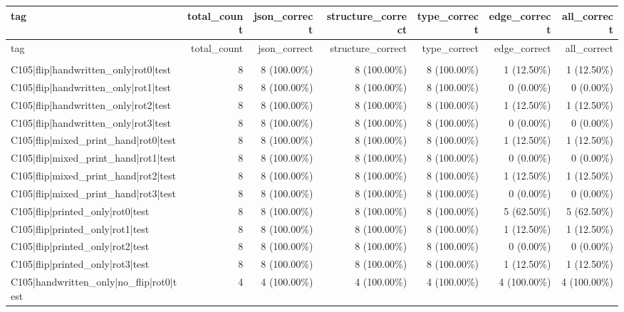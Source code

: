 \begin{longtable}{>{\raggedright\arraybackslash}p{5cm}rrrrrr}
\toprule
tag & total\_count & json\_correct & structure\_correct & type\_correct & edge\_correct & all\_correct \\
\midrule
\endfirsthead
\toprule
tag & total\_count & json\_correct & structure\_correct & type\_correct & edge\_correct & all\_correct \\
\midrule
\endhead
\midrule
\multicolumn{7}{r}{Continued on next page} \\
\midrule
\endfoot
\bottomrule
\endlastfoot
C105|flip|handwritten\_only|rot0|test & 8 & 8 (100.00\%) & 8 (100.00\%) & 8 (100.00\%) & 1 (12.50\%) & 1 (12.50\%) \\
C105|flip|handwritten\_only|rot1|test & 8 & 8 (100.00\%) & 8 (100.00\%) & 8 (100.00\%) & 0 (0.00\%) & 0 (0.00\%) \\
C105|flip|handwritten\_only|rot2|test & 8 & 8 (100.00\%) & 8 (100.00\%) & 8 (100.00\%) & 1 (12.50\%) & 1 (12.50\%) \\
C105|flip|handwritten\_only|rot3|test & 8 & 8 (100.00\%) & 8 (100.00\%) & 8 (100.00\%) & 0 (0.00\%) & 0 (0.00\%) \\
C105|flip|mixed\_print\_hand|rot0|test & 8 & 8 (100.00\%) & 8 (100.00\%) & 8 (100.00\%) & 1 (12.50\%) & 1 (12.50\%) \\
C105|flip|mixed\_print\_hand|rot1|test & 8 & 8 (100.00\%) & 8 (100.00\%) & 8 (100.00\%) & 0 (0.00\%) & 0 (0.00\%) \\
C105|flip|mixed\_print\_hand|rot2|test & 8 & 8 (100.00\%) & 8 (100.00\%) & 8 (100.00\%) & 1 (12.50\%) & 1 (12.50\%) \\
C105|flip|mixed\_print\_hand|rot3|test & 8 & 8 (100.00\%) & 8 (100.00\%) & 8 (100.00\%) & 0 (0.00\%) & 0 (0.00\%) \\
C105|flip|printed\_only|rot0|test & 8 & 8 (100.00\%) & 8 (100.00\%) & 8 (100.00\%) & 5 (62.50\%) & 5 (62.50\%) \\
C105|flip|printed\_only|rot1|test & 8 & 8 (100.00\%) & 8 (100.00\%) & 8 (100.00\%) & 1 (12.50\%) & 1 (12.50\%) \\
C105|flip|printed\_only|rot2|test & 8 & 8 (100.00\%) & 8 (100.00\%) & 8 (100.00\%) & 0 (0.00\%) & 0 (0.00\%) \\
C105|flip|printed\_only|rot3|test & 8 & 8 (100.00\%) & 8 (100.00\%) & 8 (100.00\%) & 1 (12.50\%) & 1 (12.50\%) \\
C105|handwritten\_only|no\_flip|rot0|test & 4 & 4 (100.00\%) & 4 (100.00\%) & 4 (100.00\%) & 4 (100.00\%) & 4 (100.00\%) \\

\end{longtable}

